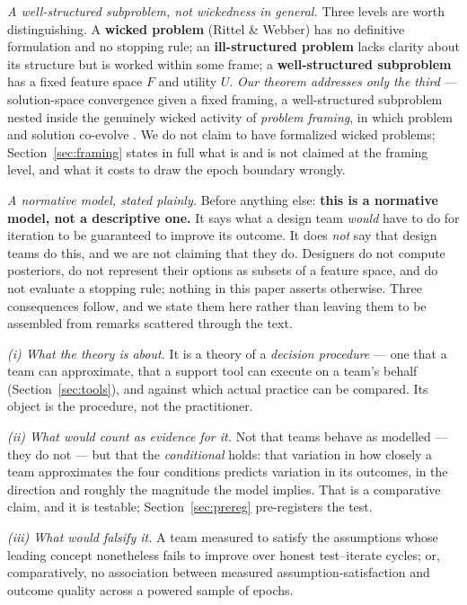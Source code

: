 \documentclass[11pt]{article}
\begin{document}
\emph{A well-structured subproblem, not wickedness in general.} Three levels are worth distinguishing. A \textbf{wicked problem} (Rittel \& Webber) has no definitive formulation and no stopping rule; an \textbf{ill-structured problem} lacks clarity about its structure but is worked within some frame; a \textbf{well-structured subproblem} has a fixed feature space $F$ and utility $U$. \emph{Our theorem addresses only the third} --- solution-space convergence given a fixed framing, a well-structured subproblem nested inside the genuinely wicked activity of \emph{problem framing}, in which problem and solution co-evolve \citep{rittel1973, dorstcross2001}. We do not claim to have formalized wicked problems; Section~\ref{sec:framing} states in full what is and is not claimed at the framing level, and what it costs to draw the epoch boundary wrongly.

\label{sec:scope-normative}\emph{A normative model, stated plainly.} Before anything else: \textbf{this is a normative model, not a descriptive one.} It says what a design team \emph{would} have to do for iteration to be guaranteed to improve its outcome. It does \emph{not} say that design teams do this, and we are not claiming that they do. Designers do not compute posteriors, do not represent their options as subsets of a feature space, and do not evaluate a stopping rule; nothing in this paper asserts otherwise. Three consequences follow, and we state them here rather than leaving them to be assembled from remarks scattered through the text.

\emph{(i) What the theory is about.} It is a theory of a \emph{decision procedure} --- one that a team can approximate, that a support tool can execute on a team's behalf (Section~\ref{sec:tools}), and against which actual practice can be compared. Its object is the procedure, not the practitioner.

\emph{(ii) What would count as evidence for it.} Not that teams behave as modelled --- they do not --- but that the \emph{conditional} holds: that variation in how closely a team approximates the four conditions predicts variation in its outcomes, in the direction and roughly the magnitude the model implies. That is a comparative claim, and it is testable; Section~\ref{sec:prereg} pre-registers the test.

\emph{(iii) What would falsify it.} A team measured to satisfy the assumptions whose leading concept nonetheless fails to improve over honest test--iterate cycles; or, comparatively, no association between measured assumption-satisfaction and outcome quality across a powered sample of epochs.
\end{document}
